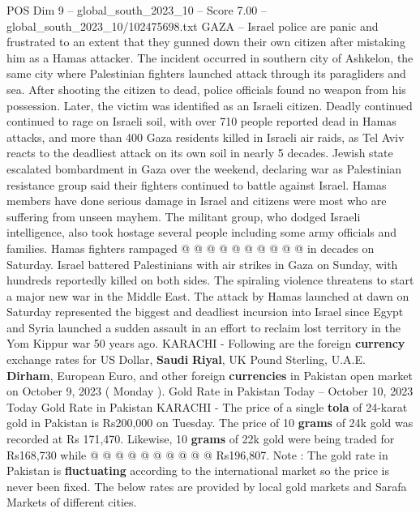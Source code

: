 \begin{textsample}{POS Dim 9 – global\_south\_2023\_10 – Score 7.00 – global\_south\_2023\_10/102475698.txt}  \label{ex:f9_pos_076}
GAZA -- Israel police are panic and frustrated to an extent that they gunned down their own citizen after mistaking him as a Hamas attacker.
The incident occurred in southern city of Ashkelon, the same city where Palestinian fighters launched attack through its paragliders and sea.
After shooting the citizen to dead, police officials found no weapon from his possession.
Later, the victim was identified as an Israeli citizen.
Deadly continued continued to rage on Israeli soil, with over 710 people reported dead in Hamas attacks, and more than 400 Gaza residents killed in Israeli air raids, as Tel Aviv reacts to the deadliest attack on its own soil in nearly 5 decades.
Jewish state escalated bombardment in Gaza over the weekend, declaring war as Palestinian resistance group said their fighters continued to battle against Israel.
Hamas members have done serious damage in Israel and citizens were most who are suffering from unseen mayhem.
The militant group, who dodged Israeli intelligence, also took hostage several people including some army officials and families.
Hamas fighters rampaged @ @ @ @ @ @ @ @ @ @ in decades on Saturday.
Israel battered Palestinians with air strikes in Gaza on Sunday, with hundreds reportedly killed on both sides.
The spiraling violence threatens to start a major new war in the Middle East.
The attack by Hamas launched at dawn on Saturday represented the biggest and deadliest incursion into Israel since Egypt and Syria launched a sudden assault in an effort to reclaim lost territory in the Yom Kippur war 50 years ago.
KARACHI - Following are the foreign \textbf{currency} exchange rates for US Dollar, \textbf{Saudi} \textbf{Riyal}, UK Pound Sterling, U.A.E. \textbf{Dirham}, European Euro, and other foreign \textbf{currencies} in Pakistan open market on October 9, 2023 ( Monday ).
Gold Rate in Pakistan Today -- October 10, 2023 Today Gold Rate in Pakistan KARACHI - The price of a single \textbf{tola} of 24-karat gold in Pakistan is Rs200,000 on Tuesday.
The price of 10 \textbf{grams} of 24k gold was recorded at Rs 171,470.
Likewise, 10 \textbf{grams} of 22k gold were being traded for Rs168,730 while @ @ @ @ @ @ @ @ @ @ Rs196,807.
Note : The gold rate in Pakistan is \textbf{fluctuating} according to the international market so the price is never been fixed.
The below rates are provided by local gold markets and Sarafa Markets of different cities.

\end{textsample}
